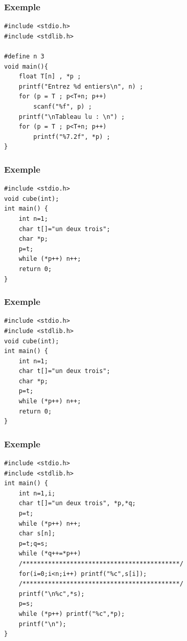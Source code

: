 \documentclass{beamer}
\begin{document}

\begin{frame}[fragile]
\frametitle{Exemple}

\begin{verbatim}
#include <stdio.h>
#include <stdlib.h>

#define n 3
void main(){
    float T[n] , *p ;
    printf("Entrez %d entiers\n", n) ;
    for (p = T ; p<T+n; p++)
        scanf("%f", p) ;
    printf("\nTableau lu : \n") ;
    for (p = T ; p<T+n; p++)
        printf("%7.2f", *p) ;
}
\end{verbatim}

\end{frame}


\begin{frame}[fragile]
\frametitle{Exemple}

\begin{verbatim}
#include <stdio.h> 
void cube(int);
int main() {
    int n=1;
    char t[]="un deux trois";
    char *p;
    p=t;
    while (*p++) n++;
    return 0;
}
\end{verbatim}

\end{frame}

\begin{frame}[fragile]
\frametitle{Exemple}

\begin{verbatim}
#include <stdio.h>
#include <stdlib.h>
void cube(int);
int main() {
    int n=1;
    char t[]="un deux trois";
    char *p;
    p=t;
    while (*p++) n++;
    return 0;
}
\end{verbatim}

\end{frame}

\begin{frame}[fragile]
\frametitle{Exemple}

\begin{verbatim}
#include <stdio.h>
#include <stdlib.h>
int main() {
    int n=1,i;
    char t[]="un deux trois", *p,*q;
    p=t;
    while (*p++) n++;
    char s[n];
    p=t;q=s;
    while (*q++=*p++)
    /*******************************************/
    for(i=0;i<n;i++) printf("%c",s[i]);
    /*******************************************/
    printf("\n%c",*s);
    p=s;
    while (*p++) printf("%c",*p);
    printf("\n");	
}
\end{verbatim}

\end{frame}
\end{document}

